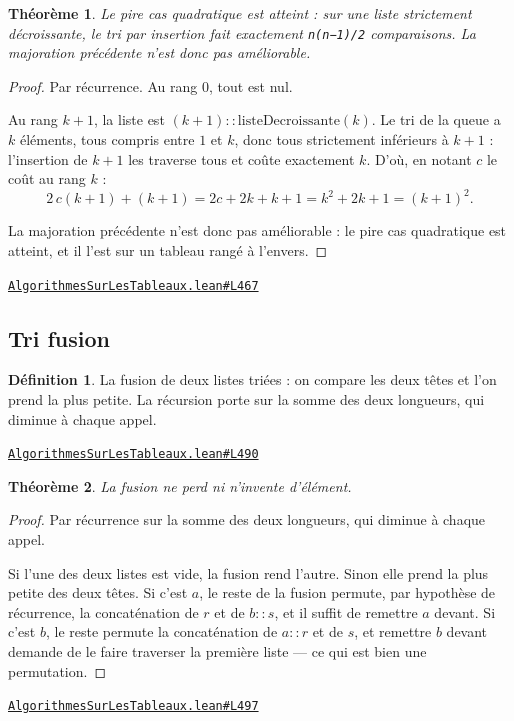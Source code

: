 \documentclass[11pt,a4paper]{article}
\theoremstyle{definition}
\newtheorem{definition}{Définition}
\theoremstyle{plain}
\newtheorem{theoreme}{Théorème}
\newcommand{\source}[2]{\par\smallskip\noindent\hfill{\footnotesize\href{#1}{\texttt{#2}}}\par\smallskip}
\begin{document}
\begin{theoreme}
Le pire cas quadratique est atteint : sur une liste strictement décroissante, le
tri par insertion fait exactement \texttt{n(n−1)/2} comparaisons. La majoration précédente
n'est donc pas améliorable.
\end{theoreme}
\begin{proof}
Par récurrence. Au rang \(0\), tout est nul.

Au rang \(k+1\), la liste est \((k+1) :: \mathrm{listeDecroissante}(k)\). Le tri de la
queue a \(k\) éléments, tous compris entre \(1\) et \(k\), donc tous strictement
inférieurs à \(k+1\) : l'insertion de \(k+1\) les traverse tous et coûte exactement
\(k\). D'où, en notant \(c\) le coût au rang \(k\) :
\[ 2\,c(k+1) + (k+1) = 2c + 2k + k + 1 = k^2 + 2k + 1 = (k+1)^2 . \]

La majoration précédente n'est donc pas améliorable : le pire cas quadratique est
atteint, et il l'est sur un tableau rangé à l'envers.
\end{proof}
\source{https://github.com/Commutator-IO/learn-lean/blob/main/courses/02-lycee/11-informatique-nsi/AlgorithmesSurLesTableaux.lean\#L467}{AlgorithmesSurLesTableaux.lean\#L467}

\subsection{Tri fusion}

\begin{definition}
La fusion de deux listes triées : on compare les deux têtes et l'on prend la plus
petite. La récursion porte sur la somme des deux longueurs, qui diminue à chaque
appel.
\end{definition}
\source{https://github.com/Commutator-IO/learn-lean/blob/main/courses/02-lycee/11-informatique-nsi/AlgorithmesSurLesTableaux.lean\#L490}{AlgorithmesSurLesTableaux.lean\#L490}

\begin{theoreme}
La fusion ne perd ni n'invente d'élément.
\end{theoreme}
\begin{proof}
Par récurrence sur la somme des deux longueurs, qui diminue à chaque appel.

Si l'une des deux listes est vide, la fusion rend l'autre. Sinon elle prend la plus
petite des deux têtes. Si c'est \(a\), le reste de la fusion permute, par hypothèse de
récurrence, la concaténation de \(r\) et de \(b :: s\), et il suffit de remettre \(a\)
devant. Si c'est \(b\), le reste permute la concaténation de \(a :: r\) et de \(s\), et
remettre \(b\) devant demande de le faire traverser la première liste — ce qui est bien
une permutation.
\end{proof}
\source{https://github.com/Commutator-IO/learn-lean/blob/main/courses/02-lycee/11-informatique-nsi/AlgorithmesSurLesTableaux.lean\#L497}{AlgorithmesSurLesTableaux.lean\#L497}
\end{document}
